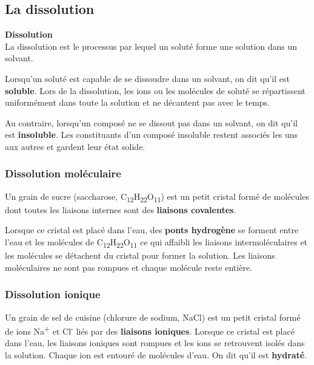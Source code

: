 \documentclass[
  11pt,
  a4paper,
  openany]{book}
\begin{document}
\hypertarget{la-dissolution}{%
\subsection{La dissolution}\label{la-dissolution}}

\begin{tcolorbox}
\textbf{Dissolution}\\
La dissolution est le processus par lequel un soluté forme une solution dans un solvant.

\end{tcolorbox}

Lorsqu'un soluté est capable de se dissoudre dans un solvant, on dit qu'il est \textbf{soluble}. Lors de la dissolution, les ions ou les molécules de soluté se répartissent uniformément dans toute la solution et ne décantent pas avec le temps.

Au contraire, lorsqu'un composé ne se dissout pas dans un solvant, on dit qu'il est \textbf{insoluble}. Les constituants d'un composé insoluble restent associés les uns aux autres et gardent leur état solide.

\hypertarget{dissolution-moluxe9culaire}{%
\subsubsection{Dissolution moléculaire}\label{dissolution-moluxe9culaire}}

Un grain de sucre (saccharose, C\textsubscript{12}H\textsubscript{22}O\textsubscript{11}) est un petit cristal formé de molécules dont toutes les liaisons internes sont des \textbf{liaisons covalentes}.

Lorsque ce cristal est placé dans l'eau, des \textbf{ponts hydrogène} se forment entre l'eau et les molécules de C\textsubscript{12}H\textsubscript{22}O\textsubscript{11} ce qui affaibli les liaisons intermoléculaires et les molécules se détachent du cristal pour former la solution. Les liaisons moléculaires ne sont pas rompues et chaque molécule reste entière.

\hypertarget{dissolution-ionique}{%
\subsubsection{Dissolution ionique}\label{dissolution-ionique}}

Un grain de sel de cuisine (chlorure de sodium, NaCl) est un petit cristal formé de ions Na\textsuperscript{+} et Cl\textsuperscript{-} liés par des \textbf{liaisons ioniques}.
Lorsque ce cristal est placé dans l'eau, les liaisons ioniques sont rompues et les ions se retrouvent isolés dans la solution. Chaque ion est entouré de molécules d'eau. On dit qu'il est \textbf{hydraté}.
\end{document}
